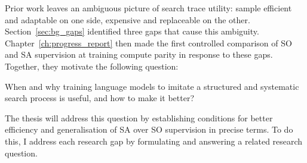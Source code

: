 Prior work leaves an ambiguous picture of search trace utility: sample efficient and adaptable on one side, expensive and replaceable on the other.
Section~\ref{sec:bg_gaps} identified three gaps that cause this ambiguity.
Chapter~\ref{ch:progress_report} then made the first controlled comparison of SO and SA supervision at training compute parity in response to these gaps.
Together, they motivate the following question:

\begin{tcolorbox}[title=Thesis Question, colback=ThesisPurple!5, colframe=ThesisPurple, fonttitle=\bfseries, fontupper=\itshape]
When and why training language models to imitate a structured and systematic search process is useful, and how to make it better?
\end{tcolorbox}

The thesis will address this question by establishing conditions for better efficiency and generalisation of SA over SO supervision in precise terms.
To do this, I address each research gap by formulating and answering a related research question.


